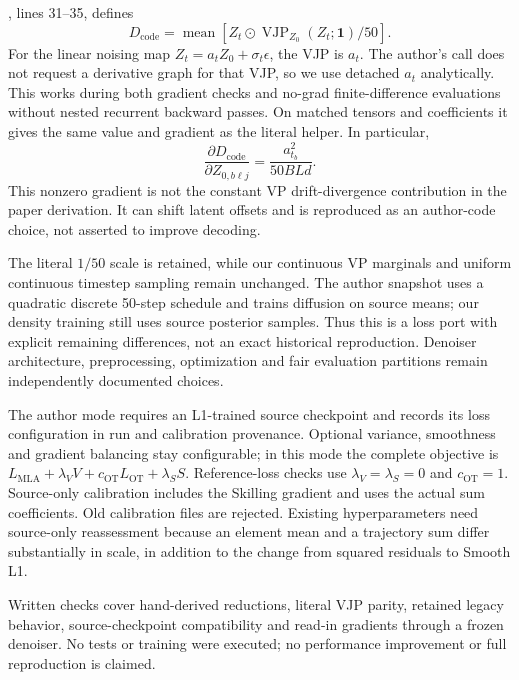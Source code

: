 \documentclass[11pt,a4paper]{article}
\begin{document}
, lines 31--35, defines
\begin{equation}
 D_{\mathrm{code}}=\operatorname{mean}\!\left[
 Z_t\odot\operatorname{VJP}_{Z_0}(Z_t;\mathbf 1)/50\right].
\end{equation}
For the linear noising map $Z_t=a_tZ_0+\sigma_t\epsilon$, the VJP is $a_t$.
The author's call does not request a derivative graph for that VJP, so we
use detached $a_t$ analytically. This works during both gradient checks and
no-grad finite-difference evaluations without nested recurrent backward
passes. On matched tensors and coefficients it gives the same value and
gradient as the literal helper. In particular,
\begin{equation}
 \frac{\partial D_{\mathrm{code}}}{\partial Z_{0,b\ell j}}
 = \frac{a_{t_b}^2}{50BLd}.
\end{equation}
This nonzero gradient is not the constant VP drift-divergence contribution
in the paper derivation. It can shift latent offsets and is reproduced as
an author-code choice, not asserted to improve decoding.

The literal $1/50$ scale is retained, while our continuous VP marginals and
uniform continuous timestep sampling remain unchanged. The author snapshot
uses a quadratic discrete 50-step schedule and trains diffusion on source
means; our density training still uses source posterior samples. Thus this
is a loss port with explicit remaining differences, not an exact historical
reproduction. Denoiser architecture, preprocessing, optimization and fair
evaluation partitions remain independently documented choices.

The author mode requires an L1-trained source checkpoint and records its
loss configuration in run and calibration provenance. Optional variance,
smoothness and gradient balancing stay configurable; in this mode the
complete objective is $L_{\mathrm{MLA}}+\lambda_VV+c_{\mathrm{OT}}L_{\mathrm{OT}}
+\lambda_SS$. Reference-loss checks use $\lambda_V=\lambda_S=0$ and
$c_{\mathrm{OT}}=1$. Source-only calibration includes the Skilling gradient
and uses the actual sum coefficients. Old calibration files are rejected.
Existing hyperparameters need source-only reassessment because an element
mean and a trajectory sum differ substantially in scale, in addition to the
change from squared residuals to Smooth L1.

Written checks cover hand-derived reductions, literal VJP parity, retained
legacy behavior, source-checkpoint compatibility and read-in gradients
through a frozen denoiser. No tests or training were executed; no performance
improvement or full reproduction is claimed.
\end{document}
